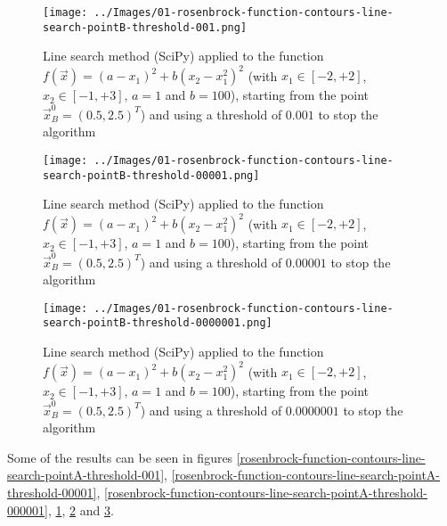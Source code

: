         \begin{figure}
            \centering
            \texttt{[image: ../Images/01-rosenbrock-function-contours-line-search-pointB-threshold-001.png]}
            \caption{Line search method (SciPy) applied to the function \(f(\vec{x}) = (a - x_1)^2 + b(x_2 - x_1^2)^2\) (with \(x_1 \in [-2, +2]\), \(x_2 \in [-1, +3]\), \(a=1\) and \(b=100\)), starting from the point \(\vec{x}_B^0 = (0.5, 2.5)^T\)) and using a threshold of \(0.001\) to stop the algorithm}
            \label{rosenbrock-function-contours-line-search-pointB-threshold-001}
        \end{figure}
        \begin{figure}
            \centering
            \texttt{[image: ../Images/01-rosenbrock-function-contours-line-search-pointB-threshold-00001.png]}
            \caption{Line search method (SciPy) applied to the function \(f(\vec{x}) = (a - x_1)^2 + b(x_2 - x_1^2)^2\) (with \(x_1 \in [-2, +2]\), \(x_2 \in [-1, +3]\), \(a=1\) and \(b=100\)), starting from the point \(\vec{x}_B^0 = (0.5, 2.5)^T\)) and using a threshold of \(0.00001\) to stop the algorithm}
            \label{rosenbrock-function-contours-line-search-pointB-threshold-00001}
        \end{figure}
        \begin{figure}
            \centering
            \texttt{[image: ../Images/01-rosenbrock-function-contours-line-search-pointB-threshold-0000001.png]}
            \caption{Line search method (SciPy) applied to the function \(f(\vec{x}) = (a - x_1)^2 + b(x_2 - x_1^2)^2\) (with \(x_1 \in [-2, +2]\), \(x_2 \in [-1, +3]\), \(a=1\) and \(b=100\)), starting from the point \(\vec{x}_B^0 = (0.5, 2.5)^T\)) and using a threshold of \(0.0000001\) to stop the algorithm}
            \label{rosenbrock-function-contours-line-search-pointB-threshold-000001}
        \end{figure}
        Some of the results can be seen in figures \ref{rosenbrock-function-contours-line-search-pointA-threshold-001}, \ref{rosenbrock-function-contours-line-search-pointA-threshold-00001}, \ref{rosenbrock-function-contours-line-search-pointA-threshold-000001}, \ref{rosenbrock-function-contours-line-search-pointB-threshold-001}, \ref{rosenbrock-function-contours-line-search-pointB-threshold-00001} and \ref{rosenbrock-function-contours-line-search-pointB-threshold-000001}.